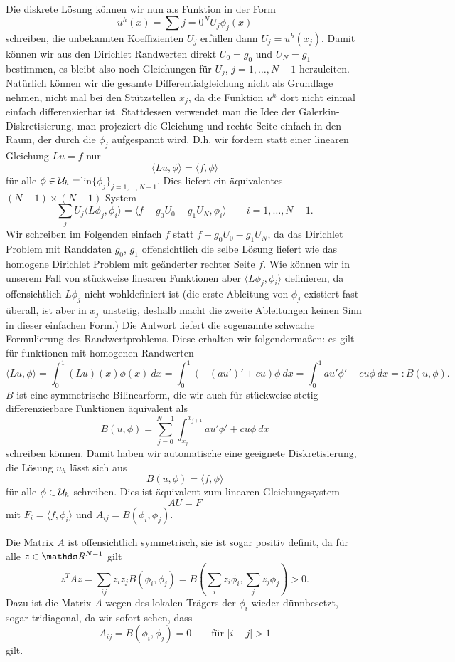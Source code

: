Die diskrete L\"osung k\"onnen wir nun als Funktion in der Form
$$ u^h(x) = \sum{j=0}^N U_j \phi_j(x) $$
schreiben, die unbekannten Koeffizienten $U_j$ erf\"ullen dann $U_j=u^h(x_j)$. Damit k\"onnen wir aus den Dirichlet Randwerten direkt $U_0=g_0$ und $U_N = g_1$ bestimmen, es bleibt also noch Gleichungen f\"ur $U_j$, $j=1,\ldots,N-1$ herzuleiten. Nat\"urlich k\"onnen wir die gesamte Differentialgleichung nicht als Grundlage nehmen, nicht mal bei den St\"utzstellen $x_j$, da die Funktion $u^h$ dort nicht einmal einfach differenzierbar ist. Stattdessen verwendet man die Idee der Galerkin-Diskretisierung, man projeziert die Gleichung und rechte Seite einfach in den Raum, der durch die $\phi_j$ aufgespannt wird. D.h. wir fordern statt einer linearen Gleichung $Lu = f$ nur 
$$ \langle Lu, \phi \rangle = \langle f, \phi \rangle $$
f\"ur alle $\phi \in {\cal U}_h = $lin$\{\phi_j\}_{j=1,\ldots,N-1}$. Dies liefert ein \"aquivalentes $(N-1) \times (N-1)$ System
$$ \sum_j U_j \langle L \phi_j, \phi_i \rangle = \langle f - g_0 U_0 - g_1 U_N, \phi_i \rangle \qquad i=1,\ldots,N-1. $$
Wir schreiben im Folgenden einfach $f$ statt $f - g_0 U_0 - g_1 U_N$, da das Dirichlet Problem mit Randdaten $g_0$, $g_1$ offensichtlich die selbe L\"osung liefert wie das homogene Dirichlet Problem mit ge\"anderter rechter Seite $f$. Wie k\"onnen wir in unserem Fall von st\"uckweise linearen Funktionen aber $\langle L\phi_j, \phi_i \rangle$ definieren, da offensichtlich $L\phi_j$ nicht wohldefiniert ist (die erste Ableitung von $\phi_j$ existiert fast \"uberall, ist aber in $x_j$ unstetig, deshalb macht die zweite Ableitungen keinen Sinn in dieser einfachen Form.) Die Antwort liefert die sogenannte schwache Formulierung des Randwertproblems. Diese erhalten wir folgenderma{\ss}en: es gilt f\"ur funktionen mit homogenen Randwerten
$$ \langle L u, \phi \rangle = \int_0^1 (Lu)(x)\phi(x)~dx = \int_0^1 (-(au')'+cu)\phi~dx = \int_0^1 a u' \phi' + cu \phi~dx =:B(u,\phi) .$$ 
$B$ ist eine symmetrische Bilinearform, die wir auch f\"ur st\"uckweise stetig differenzierbare Funktionen \"aquivalent als
$$ B(u,\phi) = \sum_{j=0}^{N-1} \int_{x_j}^{x_{j+1}} a u' \phi' + cu \phi~dx  $$ 
schreiben k\"onnen. Damit haben wir automatische eine geeignete Diskretisierung, die L\"osung $u_h$ l\"asst sich aus
$$ B(u,\phi) = \langle f, \phi \rangle $$
f\"ur alle $\phi \in {\cal U}_h$ schreiben. Dies ist \"aquivalent zum linearen Gleichungssystem 
$$ A U = F$$ 
mit $F_i =  \langle f, \phi_i \rangle$ und $A_{ij} = B(\phi_i,\phi_j)$.

Die Matrix $A$ ist offensichtlich symmetrisch, sie ist sogar positiv definit, da f\"ur alle $z \in \R^{N-1}$ gilt
$$ z^T A z = \sum_{ij} z_i z_j B(\phi_i,\phi_j) = B(\sum_i z_i \phi_i, \sum_j z_j \phi_j) > 0. $$
Dazu ist die Matrix $A$ wegen des lokalen Tr\"agers der $\phi_i$ wieder d\"unnbesetzt, sogar tridiagonal, da wir sofort sehen, dass
$$ A_{ij} = B(\phi_i,\phi_j) = 0 \qquad \text{f\"ur } \vert i - j \vert > 1$$
gilt. 

